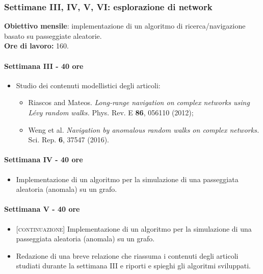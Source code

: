 {    \subsubsection{Settimane III, IV, V, VI: esplorazione di network}
    \textbf{Obiettivo mensile}: implementazione di un algoritmo di ricerca/navigazione basato su passeggiate aleatorie.
    \\
    \textbf{Ore di lavoro:} 160.
    
    \paragraph{Settimana III - 40 ore} 

    \begin{itemize}
    	\item Studio dei contenuti modellistici degli articoli:
    	\begin{itemize}
    		\item Riascos and Mateos. \textit{Long-range navigation on complex networks using Lévy
random walks.} Phys. Rev. E \textbf{86}, 056110 (2012);
			\item Weng et al. \textit{Navigation by anomalous random walks on complex networks.}
Sci. Rep. \textbf{6}, 37547 (2016).
    	\end{itemize}
    \end{itemize}

    \paragraph{Settimana IV - 40 ore} 
    
    \begin{itemize}
        \item Implementazione di un algoritmo per la simulazione di una passeggiata aleatoria (anomala) su un grafo.
    \end{itemize}

    \paragraph{Settimana V - 40 ore} 
    
    \begin{itemize}
        \item \textsc{[continuazione]} Implementazione di un algoritmo per la simulazione di una passeggiata aleatoria (anomala) su un grafo.
		\item Redazione di una breve relazione che riassuma i contenuti degli articoli studiati durante la settimana III e riporti e spieghi gli algoritmi sviluppati.
    \end{itemize}

}
